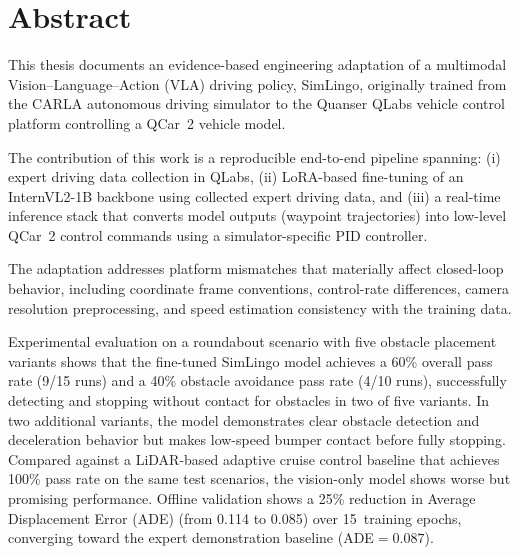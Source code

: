 \chapter*{Abstract}

This thesis documents an evidence-based engineering adaptation of a multimodal Vision--Language--Action (VLA) driving policy, SimLingo, originally trained from the CARLA autonomous driving simulator to the Quanser QLabs vehicle control platform controlling a QCar~2 vehicle model.

The contribution of this work is a reproducible end-to-end pipeline spanning: (i) expert driving data collection in QLabs, (ii) LoRA-based fine-tuning of an InternVL2-1B backbone using collected expert driving data, and (iii) a real-time inference stack that converts model outputs (waypoint trajectories) into low-level QCar~2 control commands using a simulator-specific PID controller.

The adaptation addresses platform mismatches that materially affect closed-loop behavior, including coordinate frame conventions, control-rate differences, camera resolution preprocessing, and speed estimation consistency with the training data.

Experimental evaluation on a roundabout scenario with five obstacle placement variants shows that the fine-tuned SimLingo model achieves a 60\% overall pass rate (9/15 runs) and a 40\% obstacle avoidance pass rate (4/10 runs), successfully detecting and stopping without contact for obstacles in two of five variants. In two additional variants, the model demonstrates clear obstacle detection and deceleration behavior but makes low-speed bumper contact before fully stopping. Compared against a LiDAR-based adaptive cruise control baseline that achieves 100\% pass rate on the same test scenarios, the vision-only model shows worse but promising performance. Offline validation shows a 25\% reduction in Average Displacement Error (ADE) (from 0.114 to 0.085) over 15~training epochs, converging toward the expert demonstration baseline (ADE${=}0.087$).
